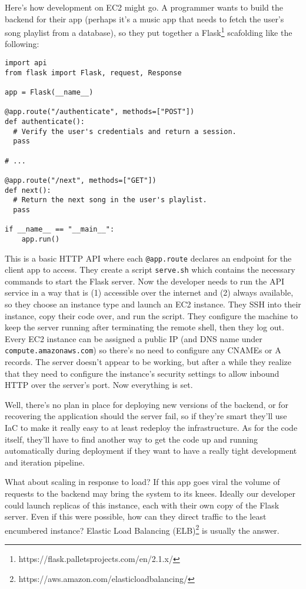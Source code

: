 \documentclass{article}
\newcommand{\icode}[1]{\texttt{#1}}
\begin{document}
Here's how development on EC2 might go.
A programmer wants to build the backend for their app (perhaps it's a music app that needs to fetch the user's song playlist from a database), so they put together a Flask\footnote{https://flask.palletsprojects.com/en/2.1.x/} scafolding like the following:

\begin{verbatim}
import api
from flask import Flask, request, Response

app = Flask(__name__)

@app.route("/authenticate", methods=["POST"])
def authenticate():
  # Verify the user's credentials and return a session.
  pass

# ...

@app.route("/next", methods=["GET"])
def next():
  # Return the next song in the user's playlist.
  pass

if __name__ == "__main__":
    app.run()
\end{verbatim}

This is a basic HTTP API where each \icode{@app.route} declares an endpoint for the client app to access.
They create a script \texttt{serve.sh} which contains the necessary commands to start the Flask server.
Now the developer needs to run the API service in a way that is (1) accessible over the internet and (2) always available, so they choose an instance type and launch an EC2 instance.
They SSH into their instance, copy their code over, and run the script.
They configure the machine to keep the server running after terminating the remote shell, then they log out.
Every EC2 instance can be assigned a public IP (and DNS name under \texttt{compute.amazonaws.com}) so there's no need to configure any CNAMEs or A records.
The server doesn't appear to be working, but after a while they realize that they need to configure the instance's security settings to allow inbound HTTP over the server's port.
Now everything is set.

Well, there's no plan in place for deploying new versions of the backend, or for recovering the application should the server fail, so if they're smart they'll use IaC to make it really easy to at least redeploy the infrastructure.
As for the code itself, they'll have to find another way to get the code up and running automatically during deployment if they want to have a really tight development and iteration pipeline.

What about scaling in response to load?
If this app goes viral the volume of requests to the backend may bring the system to its knees.
Ideally our developer could launch replicas of this instance, each with their own copy of the Flask server.
Even if this were possible, how can they direct traffic to the least encumbered instance?
Elastic Load Balancing (ELB)\footnote{https://aws.amazon.com/elasticloadbalancing/} is usually the answer.
\end{document}
